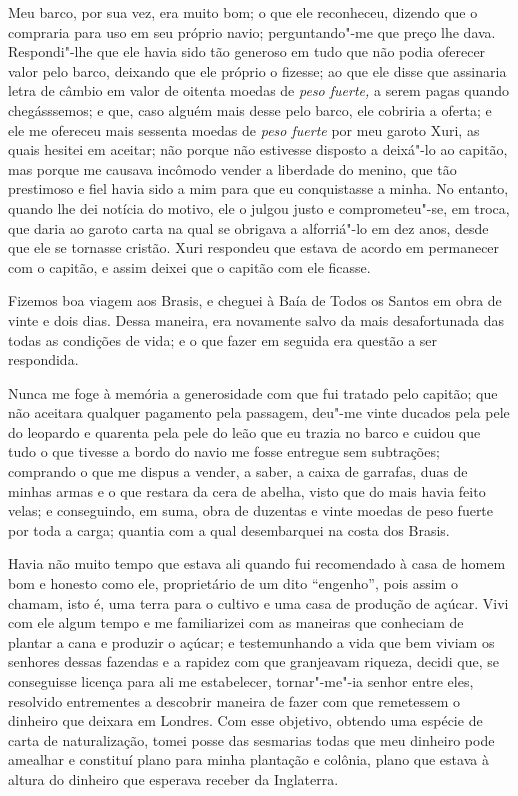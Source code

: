 Meu barco, por sua vez, era muito bom; o que ele reconheceu, dizendo que
o compraria para uso em seu próprio navio; perguntando"-me que preço lhe
dava. Respondi"-lhe que ele havia sido tão generoso em tudo que não podia
oferecer valor pelo barco, deixando que ele próprio o fizesse; ao que
ele disse que assinaria letra de câmbio em valor de oitenta moedas de
\emph{peso fuerte,} a serem pagas quando chegásssemos; e que, caso
alguém mais desse pelo barco, ele cobriria a oferta; e ele me ofereceu
mais sessenta moedas de \emph{peso fuerte} por meu garoto Xuri, as quais
hesitei em aceitar; não porque não estivesse disposto a deixá"-lo ao
capitão, mas porque me causava incômodo vender a liberdade do menino,
que tão prestimoso e fiel havia sido a mim para que eu conquistasse a
minha. No entanto, quando lhe dei notícia do motivo, ele o julgou justo
e comprometeu"-se, em troca, que daria ao garoto carta na qual se
obrigava a alforriá"-lo em dez anos, desde que ele se tornasse cristão.
Xuri respondeu que estava de acordo em permanecer com o capitão, e assim
deixei que o capitão com ele ficasse.

Fizemos boa viagem aos Brasis, e cheguei à Baía de Todos os Santos em
obra de vinte e dois dias. Dessa maneira, era novamente salvo da mais
desafortunada das todas as condições de vida; e o que fazer em seguida
era questão a ser respondida.

Nunca me foge à memória a generosidade com que fui tratado pelo capitão;
que não aceitara qualquer pagamento pela passagem, deu"-me vinte ducados
pela pele do leopardo e quarenta pela pele do leão que eu trazia no
barco e cuidou que tudo o que tivesse a bordo do navio me fosse entregue
sem subtrações; comprando o que me dispus a vender, a saber, a caixa de
garrafas, duas de minhas armas e o que restara da cera de abelha, visto
que do mais havia feito velas; e conseguindo, em suma, obra de duzentas
e vinte moedas de peso fuerte por toda a carga; quantia com a qual
desembarquei na costa dos Brasis.

Havia não muito tempo que estava ali quando fui recomendado à casa de
homem bom e honesto como ele, proprietário de um dito ``engenho'', pois
assim o chamam, isto é, uma terra para o cultivo e uma casa de produção
de açúcar. Vivi com ele algum tempo e me familiarizei com as maneiras
que conheciam de plantar a cana e produzir o açúcar; e testemunhando a
vida que bem viviam os senhores dessas fazendas e a rapidez com que
granjeavam riqueza, decidi que, se conseguisse licença para ali me
estabelecer, tornar"-me"-ia senhor entre eles, resolvido entrementes a
descobrir maneira de fazer com que remetessem o dinheiro que deixara em
Londres. Com esse objetivo, obtendo uma espécie de carta de
naturalização, tomei posse das sesmarias todas que meu dinheiro pode
amealhar e constituí plano para minha plantação e colônia, plano que
estava à altura do dinheiro que esperava receber da Inglaterra.

